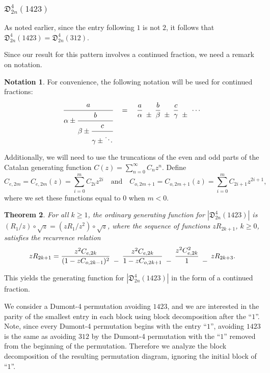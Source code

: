 \documentclass[
final
]{dmtcs-episciences}
\newtheorem{theorem}{Theorem}[section]%
\theoremstyle{definition}
\newtheorem{notation}[theorem]{Notation}
\theoremstyle{remark}
\begin{document}
\subsubsection{$\mathfrak{D}^4_{2n}(1423)$}

As noted earlier, since the entry following $1$ is not $2$, it follows that $\mathfrak{D}^4_{2n}(1423)=\mathfrak{D}^4_{2n}(312)$.

Since our result for this pattern involves a continued fraction, we need a remark on notation.

\begin{notation}
For convenience, the following notation will be used for continued fractions:
\[
\cfrac{a}{\alpha \pm \cfrac{b}{\beta \pm \cfrac{c}{\gamma \pm \ddots}}} \quad = \quad 
\frac{a}{\alpha} \,\, \genfrac{}{}{0pt}{}{}{\pm} \,\, \frac{b}{\beta} \,\, \genfrac{}{}{0pt}{}{}{\pm} \,\, \frac{c}{\gamma} \,\, \genfrac{}{}{0pt}{}{}{\pm} \,\, \cdots
\]
\end{notation}


Additionally, we will need to use the truncations of the even and odd parts of the Catalan generating function $C(z)=\sum_{n=0}^{\infty}{C_n z^n}$. Define 
\[
C_{e,2m}=C_{e,2m}(z) =  \sum_{i=0}^{m} C_{2i}z^{2i} 
\quad \text{and} \quad 
C_{o,2m+1}=C_{o,2m+1}(z) =  \sum_{i=0}^{m} C_{2i+1}z^{2i+1},
\]
where we set these functions equal to $0$ when $m<0$.

\begin{theorem}
For all $k \ge 1$, the ordinary generating function for $|\mathfrak{D}^4_{2n}(1423)|$ is $(R_1/z)\circ\sqrt{z}=(zR_1/z^2)\circ\sqrt{z}$, where the sequence of functions $zR_{2k+1}$, $k\ge 0$, satisfies the recurrence relation
\begin{equation} \label{eq:d4-312-ogf}
zR_{2k+1} = \frac{z^2C_{e,2k}}{(1-zC_{o,2k-1})^2} \,\,
 \genfrac{}{}{0pt}{}{}{-} \,\,
\frac{z^2C_{e,2k}}{1-zC_{o,2k+1}} \,\,
 \genfrac{}{}{0pt}{}{}{-} \,\,
\frac{z^2C_{e,2k}^2}{1} \,\,
 \genfrac{}{}{0pt}{}{}{-} \, \,
zR_{2k+3}.
\end{equation} 
\end{theorem}

This yields the generating function for $|\mathfrak{D}^4_{2n}(1423)|$ in the form of a continued fraction.


We consider a Dumont-4 permutation avoiding $1423$, and we are interested in the parity of the smallest entry in each block using block decomposition after the ``$1$''.  Note, since every Dumont-4 permutation begins with the entry ``$1$'', avoiding $1423$ is the same as avoiding $312$ by the Dumont-4 permutation with the ``$1$'' removed from the beginning of the permutation.  Therefore we analyze the block decomposition of the resulting permutation diagram, ignoring the initial block of ``$1$''.
\end{document}
